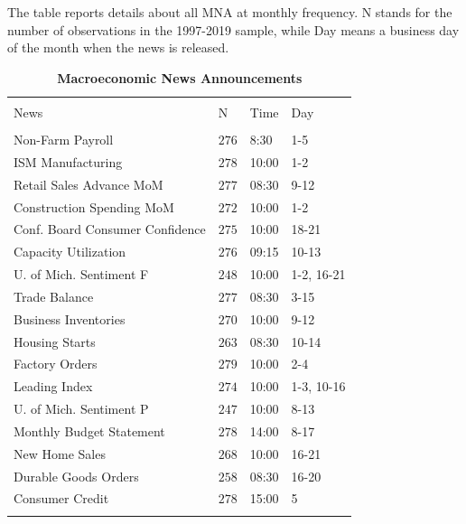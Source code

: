 \documentclass[12pt]{article}
\begin{document}
\begin{table}[!htbp] \centering 
  \caption{\textbf{Macroeconomic News Announcements}} 
  \label{} 
  \begin{flushleft}
    {\medskip\small
 The table reports details about all MNA at monthly frequency. N stands for the number of observations in the 1997-2019 sample, while Day means a business day of the month when the news is released.}
    \medskip
    \end{flushleft}
\begin{tabular}{@{\extracolsep{5pt}} llll} 
\\[-1.8ex]\hline 
\hline \\[-1.8ex] 
News & N & Time & Day \\ 
\hline \\[-1.8ex] 
Non-Farm Payroll & $276$ & 8:30 & 1-5 \\ 
ISM Manufacturing & $278$ & 10:00 & 1-2 \\ 
Retail Sales Advance MoM & $277$ & 08:30 & 9-12 \\ 
Construction Spending MoM & $272$ & 10:00 & 1-2 \\ 
Conf. Board Consumer Confidence & $275$ & 10:00 & 18-21 \\ 
Capacity Utilization & $276$ & 09:15 & 10-13 \\ 
U. of Mich. Sentiment F & $248$ & 10:00 & 1-2, 16-21 \\ 
Trade Balance & $277$ & 08:30 & 3-15 \\ 
Business Inventories & $270$ & 10:00 & 9-12 \\ 
Housing Starts & $263$ & 08:30 & 10-14 \\ 
Factory Orders & $279$ & 10:00 & 2-4 \\ 
Leading Index & $274$ & 10:00 & 1-3, 10-16 \\ 
U. of Mich. Sentiment P & $247$ & 10:00 & 8-13 \\ 
Monthly Budget Statement & $278$ & 14:00 & 8-17 \\ 
New Home Sales & $268$ & 10:00 & 16-21 \\ 
Durable Goods Orders & $258$ & 08:30 & 16-20 \\ 
Consumer Credit & $278$ & 15:00 & 5 \\ 
\hline \\[-1.8ex] 
\end{tabular} 
\end{table} 
\end{document}
